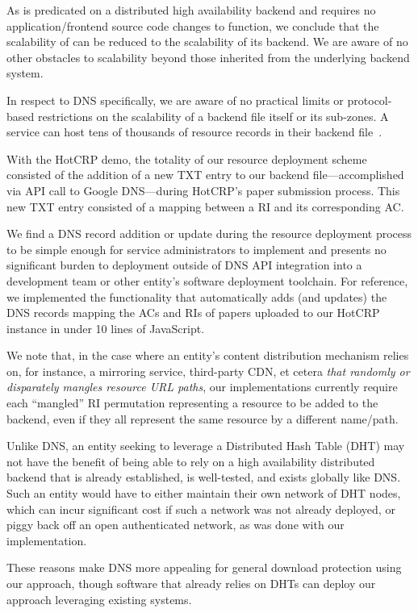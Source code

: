 As \SYSTEM{} is predicated on a distributed high availability backend and
requires no application/frontend source code changes to function, we conclude
that the scalability of \SYSTEM{} can be reduced to the scalability of its
backend. We are aware of no other obstacles to scalability beyond those
inherited from the underlying backend system.

In respect to DNS specifically, we are aware of no practical limits or
protocol-based restrictions on the scalability of a backend file itself or its
sub-zones. A service can host tens of thousands of resource records in their
backend file~\cite{DNS1, DNS2}.

With the HotCRP demo, the totality of our resource deployment scheme consisted
of the addition of a new TXT entry to our backend file---accomplished via API
call to Google DNS---during HotCRP's paper submission process. This new TXT
entry consisted of a mapping between a RI and its corresponding AC.

We find a DNS record addition or update during the resource deployment process
to be simple enough for service administrators to implement and presents no
significant burden to deployment outside of DNS API integration into a
development team or other entity's software deployment toolchain. For reference,
we implemented the functionality that automatically adds (and updates) the DNS
records mapping the ACs and RIs of papers uploaded to our HotCRP instance in
under 10 lines of JavaScript.

We note that, in the case where an entity's content distribution mechanism
relies on, for instance, a mirroring service, third-party CDN, et cetera
\emph{that randomly or disparately mangles resource URL paths}, our
implementations currently require each ``mangled'' RI permutation representing a
resource to be added to the backend, even if they all represent the same
resource by a different name/path.

Unlike DNS, an entity seeking to leverage a Distributed Hash Table (DHT) may not
have the benefit of being able to rely on a high availability distributed
backend that is already established, is well-tested, and exists
globally like DNS. Such an entity would have to either maintain their own
network of DHT nodes, which can incur significant cost if such a network was not
already deployed, or piggy back off an open authenticated network, as was done
with our implementation.

These reasons make DNS more appealing for general download protection using our
approach, though software that already relies on DHTs can deploy our approach
leveraging existing systems.

